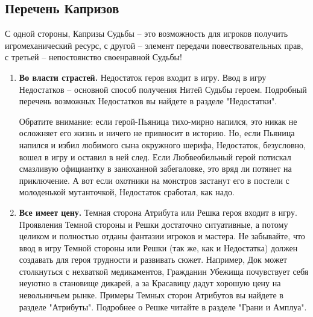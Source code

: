\subsection{Перечень Капризов}
С одной стороны, Капризы Судьбы – это возможность для игроков получить игромеханический ресурс, с другой – элемент передачи повествовательных прав, с третьей – непостоянство своенравной Судьбы!

\begin{enumerate}
    \item \textbf{Во власти страстей.}
    \newline Недостаток героя входит в игру. Ввод в игру Недостатков – основной способ получения Нитей Судьбы героем. Подробный перечень возможных Недостатков вы найдете в разделе "Недостатки". 
    \begin{tcolorbox}
        Обратите внимание: если герой-Пьяница тихо-мирно напился, это никак не осложняет его жизнь и ничего не привносит в историю. Но, если Пьяница напился и избил любимого сына окружного шерифа, Недостаток, безусловно, вошел в игру и оставил в ней след. Если Любвеобильный герой потискал смазливую официантку в занюханной забегаловке, это вряд ли потянет на приключение. А вот если охотники на монстров застанут его в постели с молоденькой мутанточкой, Недостаток сработал, как надо.
    \end{tcolorbox}

    \item \textbf{Все имеет цену.}
    \newline Темная сторона Атрибута или Решка героя входит в игру. Проявления Темной стороны и Решки достаточно ситуативные, а потому целиком и полностью отданы фантазии игроков и мастера. Не забывайте, что ввод в игру Темной стороны или Решки (так же, как и Недостатка) должен создавать для героя трудности и развивать сюжет. Например, Док может столкнуться с нехваткой медикаментов, Гражданин Убежища почувствует себя неуютно в становище дикарей, а за Красавицу дадут хорошую цену на невольничьем рынке.
    \newline Примеры Темных сторон Атрибутов вы найдете в разделе "Атрибуты". Подробнее о Решке читайте в разделе "Грани и Амплуа". 


\end{enumerate}
